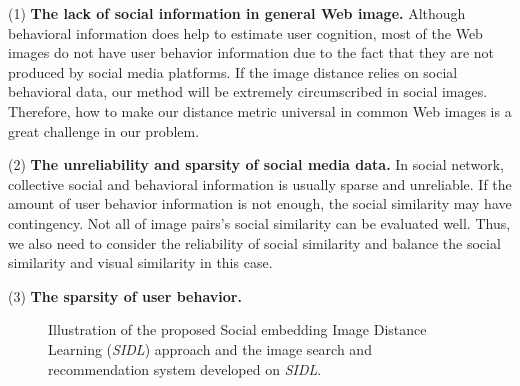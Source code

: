 (1) \textbf{The lack of social information in general Web image.} Although behavioral information does help to estimate user cognition, most of the Web images do not have user behavior information due to the fact that they are not produced by social media platforms. If the image distance relies on  social behavioral data, our method will be extremely circumscribed in social images. Therefore, how to make our distance metric universal in common Web images is a great challenge in our problem.

(2) \textbf{The unreliability and sparsity of social media data.} In social network, collective social and behavioral information is usually sparse and unreliable. If the amount of user behavior information is not enough, the social similarity may have contingency. Not all of image pairs's social similarity can be evaluated well. Thus, we also need to consider the reliability of social similarity and balance the social similarity and visual similarity in this case.

(3) \textbf{The sparsity of user behavior.} 



\begin{figure*}
\centering
{}
\caption{Illustration of the proposed Social embedding Image Distance Learning (\emph{SIDL}) approach and the image search and recommendation system developed on \emph{SIDL}.}
\label{framework}
\end{figure*}

